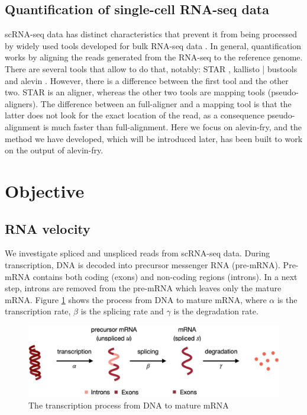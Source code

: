 \subsection{Quantification of single-cell RNA-seq data}
scRNA-seq data has distinct characteristics that prevent it from being processed by widely used tools developed for bulk RNA-seq data \citep{alevin_fry}. In general, quantification works by aligning the reads generated from the RNA-seq to the reference genome. There are several tools that allow to do that, notably: STAR \citep{star}, kallisto | bustools \citep{kallisto} and alevin \citep{alevin}. However, there is a difference between the first tool and the other two. STAR is an aligner, whereas the other two tools are mapping tools (pseudo-aligners). The difference between an full-aligner and a mapping tool is that the latter does not look for the exact location of the read, as a consequence pseudo-alignment is much faster than full-alignment. Here we focus on alevin-fry, and the method we have developed, which will be introduced later, has been built to work on the output of alevin-fry.

\section{Objective}

\subsection{RNA velocity}
We investigate spliced and unspliced reads from scRNA-seq data. During transcription, DNA is decoded into precursor messenger RNA (pre-mRNA). Pre-mRNA contains both coding (exons) and non-coding regions (introns). In a next step, introns are removed from the pre-mRNA which leaves only the mature mRNA. Figure \ref{fig:RNA_VELO} shows the process from DNA to mature mRNA, where $\alpha$ is the transcription rate, $\beta$ is the splicing rate and $\gamma$ is the degradation rate.

\begin{figure}[!htb]
\begin{center}
\includegraphics{../figures/regulation.jpg}
\end{center}
\caption{The transcription process from DNA to mature mRNA \citep{rna_velo_traj}}
\label{fig:RNA_VELO}
\end{figure}
\FloatBarrier

